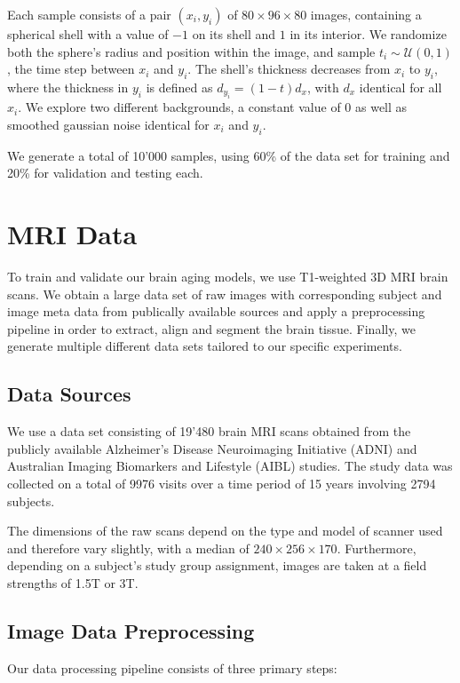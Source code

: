 Each sample consists of a pair $(x_i, y_i)$ of $ 80 \times 96 \times 80 $ images, containing a spherical shell with a value of $-1$ on its shell and $1$ in its interior. We randomize both the sphere's radius and position within the image, and sample $t_i \sim \mathcal{U}(0, 1)$, the time step between $x_i$ and $y_i$. The shell's thickness decreases from $x_i$ to $y_i$, where the thickness in $y_i$ is defined as $d_{y_i} = (1-t) d_x$, with $d_x$ identical for all $x_i$. We explore two different backgrounds, a constant value of 0 as well as smoothed gaussian noise identical for $x_i$ and $y_i$.

We generate a total of 10'000 samples, using 60\% of the data set for training and 20\% for validation and testing each.

\section{MRI Data}
To train and validate our brain aging models, we use T1-weighted 3D MRI brain scans. We obtain a large data set of raw images with corresponding subject and image meta data from publically available sources and apply a preprocessing pipeline in order to extract, align and segment the brain tissue. Finally, we generate multiple different data sets tailored to our specific experiments.

\subsection{Data Sources}
We use a data set consisting of 19'480 brain MRI scans obtained from the publicly available Alzheimer's Disease Neuroimaging Initiative (ADNI) \cite{jack2008alzheimer} and Australian Imaging Biomarkers and Lifestyle (AIBL) \cite{ellis2009australian} studies. The study data was collected on a total of 9976 visits over a time period of 15 years involving 2794 subjects.

The dimensions of the raw scans depend on the type and model of scanner used and therefore vary slightly, with a median of $ 240 \times 256 \times 170 $. Furthermore, depending on a subject's study group assignment, images are taken at a field strengths of 1.5T or 3T.

\subsection{Image Data Preprocessing}
Our data processing pipeline consists of three primary steps:

